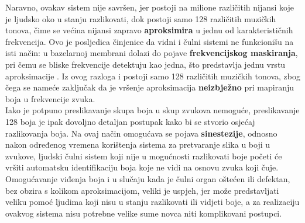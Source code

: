\documentclass[12pt,a4paper]{article}
\begin{document}
Naravno, ovakav sistem nije savršen, jer postoji na milione različitih nijansi koje je ljudsko oko u stanju razlikovati, dok postoji samo 128 različitih muzičkih tonova, čime se većina nijansi zapravo \textbf{aproksimira} u jednu od karakterističnih frekvencija. Ovo je posljedica činjenice da vidni i čulni sistemi ne funkcionišu na isti način: u bazelarnoj membrani dolazi do pojave \textbf{frekvencijskog maskiranja}, pri čemu se bliske frekvencije detektuju kao jedna, što predstavlja jednu vrstu aproksimacije \cite{shupi}. Iz ovog razloga i postoji samo 128 različitih muzičkih tonova, zbog čega se nameće zaključak da je vršenje aproksimacija \textbf{neizbježno} pri mapiranju boja u frekvencije zvuka. \\

Iako je potpuno preslikavanje skupa boja u skup zvukova nemoguće, preslikavanje 128 boja je ipak dovoljno detaljan postupak kako bi se stvorio osjećaj razlikovanja boja. Na ovaj način omogućava se pojava \textbf{sinestezije}, odnosno nakon određenog vremena korištenja sistema za pretvaranje slika u boji u zvukove, ljudski čulni sistem koji nije u mogućnosti razlikovati boje početi će vršiti automatsku identifikaciju boja koje ne vidi na osnovu zvuka koji čuje. Omogućavanje viđenja boja i u slučaju kada je čulni organ oštećen ili defektan, bez obzira s kolikom aproksimacijom, veliki je uspjeh, jer može predstavljati veliku pomoć ljudima koji nisu u stanju razlikovati ili vidjeti boje, a za realizaciju ovakvog sistema nisu potrebne velike sume novca niti komplikovani postupci.

\newpage



\end{document}
